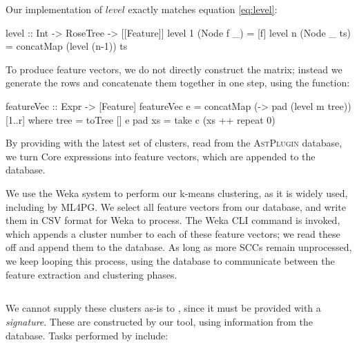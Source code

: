 Our implementation of $level$ exactly matches equation \ref{eq:level}:

\begin{haskell}
level :: Int -> RoseTree -> [[Feature]]
level 1 (Node f _)  = [f]
level n (Node _ ts) = concatMap (level (n-1)) ts
\end{haskell}

To produce feature vectors, we do not directly construct the matrix; instead we
generate the rows and concatenate them together in one step, using the
 function:

\begin{haskell}
featureVec :: Expr -> [Feature]
featureVec e = concatMap (\m -> pad (level m tree)) [1..r]
  where tree   = toTree [] e
        pad xs = take c (xs ++ repeat 0)
\end{haskell}

By providing  with the latest set of clusters, read from the
\textsc{AstPlugin} database, we turn Core expressions into feature vectors,
which are appended to the database.

We use the Weka system to perform our k-means clustering, as it is widely used,
including by ML4PG. We select all feature vectors from our database, and write
them in CSV format for Weka to process. The Weka CLI command is invoked, which
appends a cluster number to each of these feature vectors; we read these off and
append them to the database. As long as more SCCs remain unprocessed, we keep
looping this process, using the database to communicate between the feature
extraction and clustering phases.

\subsection{\mlspec{}}
\label{sec:mlspec}

We cannot supply these clusters as-is to \quickspec{}, since it must be provided
with a \emph{signature}. These are constructed by our \mlspec{} tool,
using information from the \astplugin{} database. Tasks performed by
\mlspec{} include:

